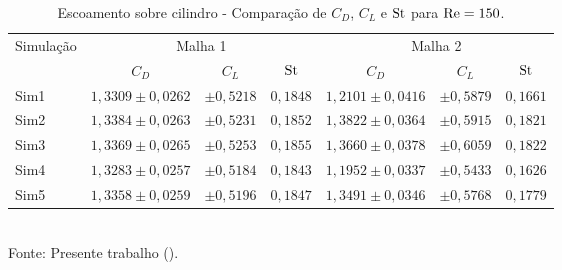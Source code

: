 \begin{table}[h!]
    \centering
    \caption{Escoamento sobre cilindro - Comparação de $C_D$, $C_L$ e $\mathrm{St}$ para $\mathrm{Re}=150$.}
    \begin{tabular}{lcccccc}
        \hline
        \multirow{2}{*}{Simulação} & \multicolumn{3}{c}{Malha 1} & \multicolumn{3}{c}{Malha 2}                                                         \\\cline{2-7}
                                   & $C_D$                       & $C_L$                       & $\mathrm{St}$   & $C_D$             & $C_L$       & $\mathrm{St}$   \\\hline
        Sim1                       & $1,3309\pm0,0262$           & $\pm0,5218$                 & $0,1848$ & $1,2101\pm0,0416$ & $\pm0,5879$ & $0,1661$ \\
        Sim2                       & $1,3384\pm0,0263$           & $\pm0,5231$                 & $0,1852$ & $1,3822\pm0,0364$ & $\pm0,5915$ & $0,1821$ \\
        Sim3                       & $1,3369\pm0,0265$           & $\pm0,5253$                 & $0,1855$ & $1,3660\pm0,0378$ & $\pm0,6059$ & $0,1822$ \\
        Sim4                       & $1,3283\pm0,0257$           & $\pm0,5184$                 & $0,1843$ & $1,1952\pm0,0337$ & $\pm0,5433$ & $0,1626$ \\
        Sim5                       & $1,3358\pm0,0259$           & $\pm0,5196$                 & $0,1847$ & $1,3491\pm0,0346$ & $\pm0,5768$ & $0,1779$ \\\hline
    \end{tabular}
    \\Fonte: Presente trabalho (\the\year).
    \label{tab:cyl-comp150}
\end{table}

